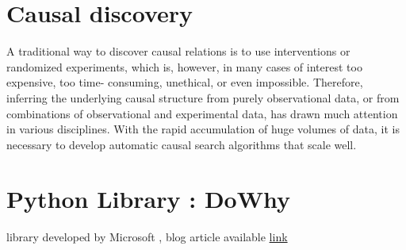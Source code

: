 \documentclass{article}
\begin{document}
\cite{rubin2005causal}


\section{Causal discovery}

A traditional way to discover causal relations is to use interventions or randomized experiments, which is, however, in many cases of interest too expensive, too time- consuming, unethical, or even impossible. Therefore, inferring the underlying causal structure from purely observational data, or from combinations of observational and experimental data, has drawn much attention in various disciplines. With the rapid accumulation of huge volumes of data, it is necessary to develop automatic causal search algorithms that scale well.\cite{10.3389/fgene.2019.00524}


\section{Python Library : DoWhy}
library developed by Microsoft \cite{dowhy}, blog article available \href{https://www.microsoft.com/en-us/research/blog/dowhy-a-library-for-causal-inference/}{link}


\newpage
\nocite{*}    %

\end{document}
